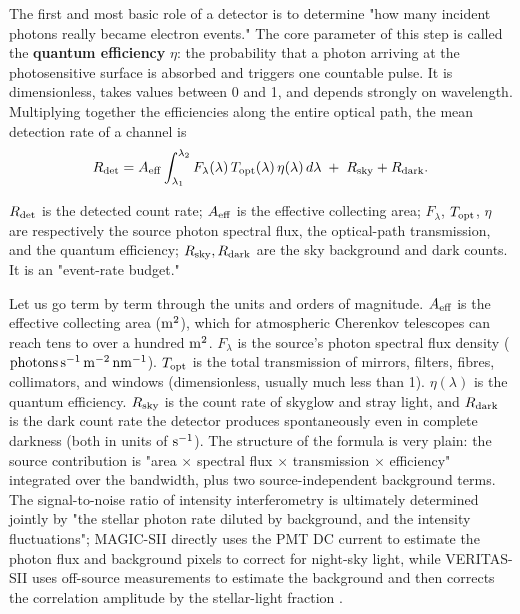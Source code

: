The first and most basic role of a detector is to determine "how many incident photons really became electron events." The core parameter of this step is called the \textbf{quantum efficiency} $\eta$: the probability that a photon arriving at the photosensitive surface is absorbed and triggers one countable pulse. It is dimensionless, takes values between 0 and 1, and depends strongly on wavelength. Multiplying together the efficiencies along the entire optical path, the mean detection rate of a channel is
\begin{equation}
  R_{\rm det}
  =
  A_{\rm eff}
  \int_{\lambda_1}^{\lambda_2}
  F_\lambda(\lambda)\,
  T_{\rm opt}(\lambda)\,
  \eta(\lambda)\,
  d\lambda
  \;+\;R_{\rm sky}+R_{\rm dark}.
  \label{eq:e13-detected-rate}
\end{equation}
\begin{formulaexplain}
$R_{\rm det}$ is the detected count rate; $A_{\rm eff}$ is the effective collecting area; $F_\lambda$, $T_{\rm opt}$, $\eta$ are respectively the source photon spectral flux, the optical-path transmission, and the quantum efficiency; $R_{\rm sky},R_{\rm dark}$ are the sky background and dark counts. It is an "event-rate budget."
\end{formulaexplain}
Let us go term by term through the units and orders of magnitude. $A_{\rm eff}$ is the effective collecting area (${\rm m}^2$), which for atmospheric Cherenkov telescopes can reach tens to over a hundred ${\rm m}^2$. $F_\lambda$ is the source's photon spectral flux density (${\rm photons\,s^{-1}\,m^{-2}\,nm^{-1}}$). $T_{\rm opt}$ is the total transmission of mirrors, filters, fibres, collimators, and windows (dimensionless, usually much less than 1). $\eta(\lambda)$ is the quantum efficiency. $R_{\rm sky}$ is the count rate of skyglow and stray light, and $R_{\rm dark}$ is the dark count rate the detector produces spontaneously even in complete darkness (both in units of ${\rm s}^{-1}$). The structure of the formula is very plain: the source contribution is "area $\times$ spectral flux $\times$ transmission $\times$ efficiency" integrated over the bandwidth, plus two source-independent background terms. The signal-to-noise ratio of intensity interferometry is ultimately determined jointly by "the stellar photon rate diluted by background, and the intensity fluctuations"; MAGIC-SII directly uses the PMT DC current to estimate the photon flux and background pixels to correct for night-sky light, while VERITAS-SII uses off-source measurements to estimate the background and then corrects the correlation amplitude by the stellar-light fraction \citep{2020NatAs...4.1164A,2024MNRAS.529.4387A}.

